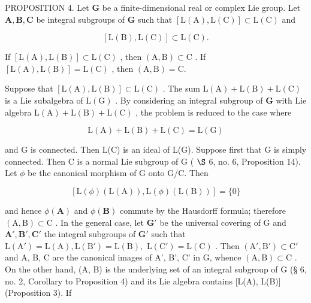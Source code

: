 PROPOSITION 4. Let \(\mathbf{G}\) be a finite-dimensional real or complex Lie group. Let \(\mathbf{A}, \mathbf{B}, \mathbf{C}\) be integral subgroups of \(\mathbf{G}\) such that \([\mathrm{L}(\mathrm{A}), \mathrm{L}(\mathrm{C})] \subset \mathrm{L}(\mathrm{C})\) and

\[
[ \mathrm{L} (\mathrm{B}), \mathrm{L} (\mathrm{C}) ] \subset \mathrm{L} (\mathrm{C}).
\]

If \([\mathrm{L}(\mathrm{A}),\mathrm{L}(\mathrm{B})]\subset \mathrm{L}(\mathrm{C})\) , then \((\mathrm{A},\mathrm{B})\subset \mathrm{C}\) . If \([\mathrm{L}(\mathrm{A}),\mathrm{L}(\mathrm{B})] = \mathrm{L}(\mathrm{C})\) , then \((\mathrm{A},\mathrm{B}) = \mathrm{C}\).

Suppose that \([\mathrm{L}(\mathrm{A}),\mathrm{L}(\mathrm{B})]\subset \mathrm{L}(\mathrm{C})\) . The sum \(\mathrm{L}(\mathrm{A}) + \mathrm{L}(\mathrm{B}) + \mathrm{L}(\mathrm{C})\) is a Lie subalgebra of \(\mathrm{L}(\mathrm{G})\) . By considering an integral subgroup of \(\mathbf{G}\) with Lie algebra \(\mathrm{L}(\mathrm{A}) + \mathrm{L}(\mathrm{B}) + \mathrm{L}(\mathrm{C})\) , the problem is reduced to the case where

\[
\mathrm{L} (\mathrm{A}) + \mathrm{L} (\mathrm{B}) + \mathrm{L} (\mathrm{C}) = \mathrm{L} (\mathrm{G})
\]

and G is connected. Then L(C) is an ideal of L(G). Suppose first that G is simply connected. Then C is a normal Lie subgroup of G ( \(\S\) 6, no. 6, Proposition 14). Let \(\phi\) be the canonical morphism of G onto G/C. Then

\[
[ \mathrm{L} (\phi) (\mathrm{L} (\mathrm{A})), \mathrm{L} (\phi) (\mathrm{L} (\mathrm{B})) ] = \{0 \}
\]

and hence \(\phi (\mathbf{A})\) and \(\phi (\mathbf{B})\) commute by the Hausdorff formula; therefore \((\mathrm{A},\mathrm{B})\subset \mathrm{C}\) . In the general case, let \(\mathbf{G}'\) be the universal covering of G and \(\mathbf{A}',\mathbf{B}',\mathbf{C}'\) the integral subgroups of \(\mathbf{G}'\) such that \(\mathrm{L}(\mathrm{A}') = \mathrm{L}(\mathrm{A}),\mathrm{L}(\mathrm{B}') = \mathrm{L}(\mathrm{B}),\) \(\mathrm{L}(\mathrm{C}') = \mathrm{L}(\mathrm{C})\) . Then \((\mathrm{A}',\mathrm{B}')\subset \mathrm{C}'\) and A, B, C are the canonical images of A', B', C' in G, whence \((\mathrm{A},\mathrm{B})\subset \mathrm{C}\) . On the other hand, (A, B) is the underlying set of an integral subgroup of G (§ 6, no. 2, Corollary to Proposition 4) and its Lie algebra contains [L(A), L(B)] (Proposition 3). If

